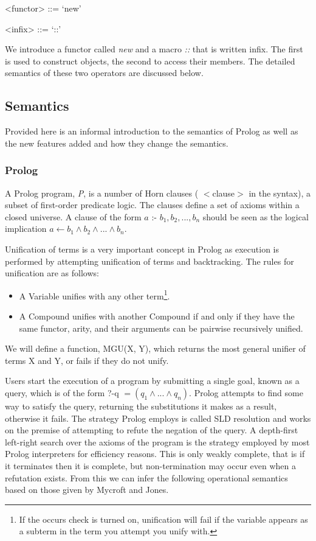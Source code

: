 \documentclass[12pt,a4paper,twoside,openright]{report}
\begin{document}
\begin{grammar}
<functor> ::= `new'

<infix> ::= `::'
\end{grammar}

We introduce a functor called \emph{new} and a macro \emph{::} that is written infix. The first is used to construct objects, the second to access their members. The detailed semantics of these two operators are discussed below.

\subsection {Semantics}

Provided here is an informal introduction to the semantics of Prolog as well as the new features added and how they change the semantics.

\subsubsection {Prolog}

A Prolog program, \emph{P}, is a number of Horn clauses ( $<$clause$>$ in the syntax), a subset of first-order predicate logic. The clauses define a set of axioms within a closed universe. A clause of the form $a$ :- $b_1, b_2, ..., b_n$ should be seen as the logical implication $a \leftarrow b_1 \land b_2 \land ... \land b_n$. 

\bigskip

Unification of terms is a very important concept in Prolog as execution is performed by attempting unification of terms and backtracking. The rules for unification are as follows:

\begin{itemize}
	\item A Variable unifies with any other term\footnote{If the occurs check is turned on, unification will fail if the variable appears as a subterm in the term you attempt you unify with.}.
 	\item A Compound unifies with another Compound if and only if they have the same functor, arity, and their arguments can be pairwise recursively unified.
\end{itemize}

We will define a function, MGU(X, Y), which returns the most general unifier of terms X and Y, or fails if they do not unify.

\bigskip

Users start the execution of a program by submitting a single goal, known as a query, which is of the form ?-q $ = (q_1 \land ... \land q_n)$. Prolog attempts to find some way to satisfy the query, returning the substitutions it makes as a result, otherwise it fails. The strategy Prolog employs is called SLD resolution and works on the premise of attempting to refute the negation of the query. A depth-first left-right search over the axioms of the program is the strategy employed by most Prolog interpreters for efficiency reasons. This is only weakly complete, that is if it terminates then it is complete, but non-termination may occur even when a refutation exists. From this we can infer the following operational semantics based on those given by Mycroft and Jones\cite{MYCROFT}.
\end{document}
